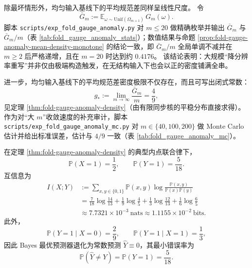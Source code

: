 \begin{remark}\label{rem:fold-gauge-anomaly-typical}
除最坏情形外，均匀输入基线下的平均规范差同样呈线性尺度。
令
$$
\bar G_m:=\mathbb{E}_{\omega\sim\mathrm{Unif}(\Omega_{m+1})}\,G_m(\omega).
$$
脚本 \texttt{scripts/exp\_fold\_gauge\_anomaly.py} 对 \(m\le 20\) 做精确枚举并输出 \(\bar G_m\) 与 \(\bar G_m/m\)（表 \ref{tab:fold_gauge_anomaly_stats}）；数值结果与命题 \ref{prop:fold-gauge-anomaly-mean-density-monotone} 的结论一致，即 \(\bar G_m/m\) 全局单调不减并在 \(m\ge 2\) 后严格递增，且在 \(m=20\) 时达到约 \(0.4176\)。
该结论表明：大规模“降分辨率重写”并非仅由极端构造触发，在无结构输入下也会以正的密度铺满全串。
\par
进一步，均匀输入基线下的平均规范差密度极限不仅存在，而且可写出闭式常数：
\[
g_\ast:=\lim_{m\to\infty}\frac{\bar G_m}{m}=\frac49,
\]
见定理 \ref{thm:fold-gauge-anomaly-density}（由有限同步核的平稳分布直接求得）。
作为对“大 \(m\)”收敛速度的补充审计，脚本 \texttt{scripts/exp\_fold\_gauge\_anomaly\_mc.py} 对 \(m\in\{40,100,200\}\) 做 Monte Carlo 估计并给出标准误差，估计与 \(4/9\) 一致（表 \ref{tab:fold_gauge_anomaly_mc}）。
\end{remark}





\iffalse
\begin{corollary}\label{cor:fold-gauge-anomaly-mi}
在定理 \ref{thm:fold-gauge-anomaly-density} 的典型内点联合律下，
\[
\mathbb P(X=1)=\frac12,\qquad \mathbb P(Y=1)=\frac{5}{18}.
\]
互信息为
\begin{align}
I(X;Y)&:=\sum_{x,y\in\{0,1\}}\mathbb P(x,y)\log\frac{\mathbb P(x,y)}{\mathbb P(x)\mathbb P(y)}\nonumber\\
&=\frac{7}{18}\log\frac{14}{13}+\frac{1}{9}\log\frac{4}{5}+\frac{1}{3}\log\frac{12}{13}+\frac{1}{6}\log\frac{6}{5}\nonumber\\
&\approx 7.7321\times 10^{-3}\ \text{nats}\approx 1.1155\times 10^{-2}\ \text{bits}.
\end{align}
此外，
\[
\mathbb P(Y=1\mid X=0)=\frac{2}{9},\qquad \mathbb P(Y=1\mid X=1)=\frac{1}{3},
\]
因此 Bayes 最优预测器退化为常数预测 \(\widehat Y\equiv 0\)，其最小错误率为
\[
\mathbb P(\widehat Y\neq Y)=\mathbb P(Y=1)=\frac{5}{18}.
\]
\end{corollary}

